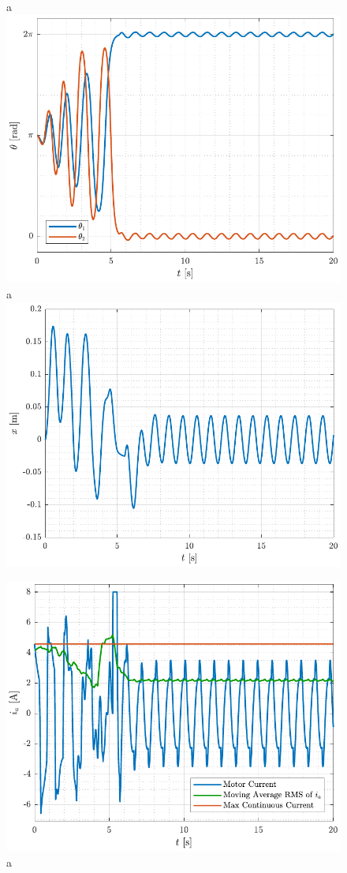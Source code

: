 \begin{figure}[H]
  \hspace{-10pt}
  \captionbox 
  {
    a
    \label{fig:theta_twinSwingAndCatch}
  }
  {
    \hspace{-1cm}
    \includegraphics[width=.46\textwidth]{figures/theta_twinSwingAndCatch}
  }
  \hspace{20pt}
  \captionbox 
  {
    a
    \label{fig:ani_twinSwingAndCatch}
  }
  {
    \hspace{-1cm}
    \includegraphics[width=.46\textwidth]{figures/x_twinSwingAndCatch}
  }
\end{figure}
%
%
\begin{figure}[H]
  \includegraphics[width=.5\textwidth]{figures/ia_twinSwingAndCatch}
  \caption{a}
  \label{fig:ia_twinSwingAndCatch}
\end{figure}
%
